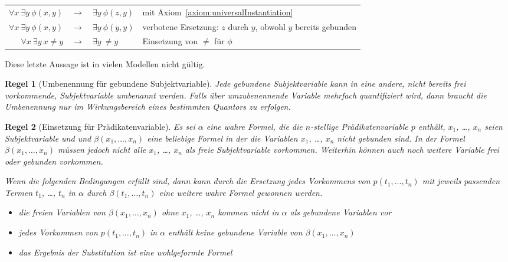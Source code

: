 \documentclass[a4paper,german,10pt,twoside]{book}
\newtheorem{rul}{Regel}
\theoremstyle{definition}
\theoremstyle{remark}
\begin{document}
\par
\begin{tabularx}{\linewidth}{rclX}
  $\forall x \ \exists y \ \phi(x, y)$ & $\rightarrow$ & $\exists y \ \phi(z,y)$ 
    & mit Axiom~\ref{axiom:universalInstantiation} \\
  $\forall x \ \exists y \ \phi(x, y)$ & $\rightarrow$ & $\exists y \ \phi(y,y)$ 
    & verbotene Ersetzung: $z$ durch $y$, obwohl $y$ bereits gebunden \\
  $\forall x \ \exists y \ x \neq y$ & $\rightarrow$ & $\exists y \ \neq y$ 
    &  Einsetzung von $\neq$ f{\"u}r $\phi$
\end{tabularx}

\par
Diese letzte Aussage ist in vielen Modellen nicht g{\"u}ltig.


\par


\begin{rul}[Umbenennung f{\"u}r gebundene Subjektvariable]
\label{rule:renameBound} \hypertarget{rule:renameBound}{}
Jede gebundene Subjektvariable kann in eine andere, nicht bereits frei vorkommende, Subjektvariable umbenannt werden. Falls {\"u}ber umzubenennende Variable mehrfach quantifiziert wird, dann braucht die Umbenennung nur im Wirkungsbereich eines bestimmten Quantors zu erfolgen.
\end{rul}




\par


\begin{rul}[Einsetzung f{\"u}r Pr{\"a}dikatenvariable]
\label{rule:replacePred} \hypertarget{rule:replacePred}{}
Es sei $\alpha$ eine wahre Formel, die die $n$-stellige Pr{\"a}dikatenvariable $p$ enth{\"a}lt,
$x_1$, \ldots, $x_n$ seien Subjektvariable und 
und $\beta(x_1, \ldots, x_n)$ eine beliebige Formel in der die Variablen $x_1$, \ldots, $x_n$ nicht gebunden sind. In der Formel $\beta(x_1, \ldots, x_n)$ m{\"u}ssen jedoch nicht alle $x_1$, \ldots, $x_n$ als freie Subjektvariable vorkommen. Weiterhin k{\"o}nnen auch noch weitere Variable frei oder gebunden vorkommen. 

Wenn die folgenden Bedingungen erf{\"u}llt sind, dann kann durch die Ersetzung jedes Vorkommens von $p(t_1, \ldots, t_n)$ mit jeweils passenden Termen $t_1$, \ldots, $t_n$ in $\alpha$ durch $\beta(t_1, \ldots, t_n)$ eine
weitere wahre Formel gewonnen werden.

\begin{itemize}

\item 
die freien Variablen von $\beta(x_1, \ldots, x_n)$ ohne $x_1$, \ldots, $x_n$ kommen nicht in $\alpha$ als gebundene Variablen vor

\item
jedes Vorkommen von $p(t_1, \ldots, t_n)$ in $\alpha$ enth{\"a}lt keine gebundene Variable von $\beta(x_1, \ldots, x_n)$

\item
das Ergebnis der Substitution ist eine wohlgeformte Formel

\end{itemize}
\end{rul}
\end{document}
